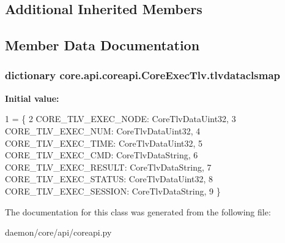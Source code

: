 \subsection*{Additional Inherited Members}


\subsection{Member Data Documentation}
\hypertarget{classcore_1_1api_1_1coreapi_1_1_core_exec_tlv_a9beacf6761ea37acab7071dcfb11ae3f}{
\subsubsection[{tlvdataclsmap}]{\setlength{\rightskip}{0pt plus 5cm}dictionary core.\+api.\+coreapi.\+Core\+Exec\+Tlv.\+tlvdataclsmap\hspace{0.3cm}{\ttfamily [static]}}}\label{classcore_1_1api_1_1coreapi_1_1_core_exec_tlv_a9beacf6761ea37acab7071dcfb11ae3f}
{\bfseries Initial value\+:}
\begin{DoxyCode}
1 = \{
2         CORE\_TLV\_EXEC\_NODE: CoreTlvDataUint32,
3         CORE\_TLV\_EXEC\_NUM: CoreTlvDataUint32,
4         CORE\_TLV\_EXEC\_TIME: CoreTlvDataUint32,
5         CORE\_TLV\_EXEC\_CMD: CoreTlvDataString,
6         CORE\_TLV\_EXEC\_RESULT: CoreTlvDataString,
7         CORE\_TLV\_EXEC\_STATUS: CoreTlvDataUint32,
8         CORE\_TLV\_EXEC\_SESSION: CoreTlvDataString,
9     \}
\end{DoxyCode}


The documentation for this class was generated from the following file\+:\begin{DoxyCompactItemize}
\item 
daemon/core/api/coreapi.\+py\end{DoxyCompactItemize}
